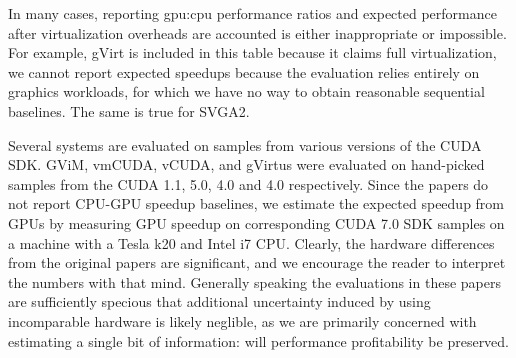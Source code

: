 In many cases, reporting gpu:cpu performance ratios and expected performance
after virtualization overheads are accounted is either inappropriate or
impossible. For example, gVirt is included in this table because it claims
full virtualization, we cannot report expected speedups because the evaluation
relies entirely on graphics workloads, for which we have no way to obtain
reasonable sequential baselines. The same is true for SVGA2.

Several systems are evaluated on samples from various versions of the CUDA SDK.
GViM, vmCUDA, vCUDA, and gVirtus were evaluated on hand-picked samples from
the CUDA 1.1, 5.0, 4.0 and 4.0 respectively. Since the papers do not report
CPU-GPU speedup baselines, we estimate the expected speedup from GPUs by
measuring GPU speedup on corresponding CUDA 7.0 SDK samples on a machine with
a Tesla k20 and Intel i7 CPU. Clearly, the hardware differences from the
original papers are significant, and we encourage the reader to interpret the
numbers with that mind. Generally speaking the evaluations in these papers
are sufficiently specious that additional uncertainty induced by using
incomparable hardware is likely neglible, as we are primarily concerned with
estimating a single bit of information: will performance profitability be
preserved.